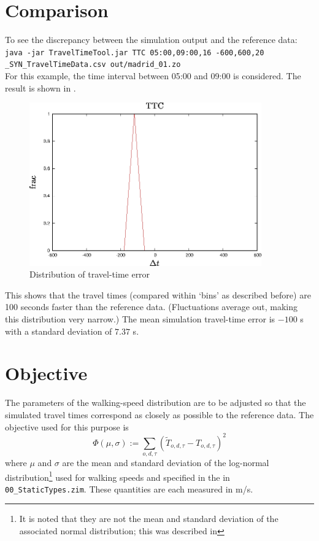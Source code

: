 \section{Comparison}
To see the discrepancy between the simulation output and the reference data:
{\tt java -jar TravelTimeTool.jar TTC 05:00,09:00,16 -600,600,20 \_SYN\_TravelTimeData.csv out/madrid\_01.zo }\\
For this example, the time interval between 05:00 and 09:00 is considered.
The result is shown in .
\begin{figure}[ht!]
  \centering
  \includegraphics[angle=0,width=10cm]{80_figs/_TTC_0500-0900.eps}
  \caption{Distribution of travel-time error}
  \label{TTdiff}
\end{figure}
This shows that the travel times (compared within `bins' as described before) are 100 seconds
faster than the reference data. (Fluctuations average out, making this distribution very narrow.)
The mean simulation travel-time error is $-100$ s with a standard deviation of $7.37$ s.

\section{Objective}
\label{DefObj}
The parameters of the walking-speed distribution are to be adjusted so that the simulated
travel times correspond as closely as possible to the reference data.
The objective used for this purpose is
\[
\Phi(\mu,\sigma) := \sum_{o,d,\tau} (\tilde{T}_{o,d,\tau} - T_{o,d,\tau})^2
\]
where $\mu$ and $\sigma$ are the mean and standard deviation of the
log-normal distribution\footnote{It is noted that they are not the
 mean and standard deviation of the associated normal distribution; this was described in }
used for walking speeds and specified in the  in {\tt 00\_StaticTypes.zim}.
These quantities are each measured in m/s.

